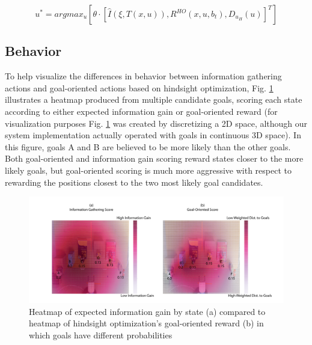\documentclass[conference]{IEEEtran}
\begin{document}
\[
u^* = argmax_u [ \theta \cdot [\hat{I}(\xi, T(x,u)), R^{HO}(x,u,b_t), D_{u_H}(u)]^T ]
\]

\subsection{Behavior}

To help visualize the differences in behavior between information gathering actions and goal-oriented actions based on hindsight optimization, %
Fig. \ref{heatmap2} illustrates a heatmap produced from multiple candidate goals, scoring each state according to either expected information gain or goal-oriented reward (for visualization purposes Fig. \ref{heatmap2} was created by discretizing a 2D space, although our system implementation actually operated with goals in continuous 3D space). In this figure, goals A and B are believed to be more likely than the other goals. Both goal-oriented and information gain scoring reward states closer to the more likely goals, but goal-oriented scoring is much more aggressive with respect to rewarding the positions closest to the two most likely goal candidates.



\begin{figure}
\includegraphics[width=\columnwidth]{figures/Heatmap_Uneven_Belief.pdf}
\caption{Heatmap of expected information gain by state (a) compared to heatmap of hindsight optimization's goal-oriented reward (b) in which goals have different probabilities}
\label{heatmap2}
\end{figure}
\end{document}
